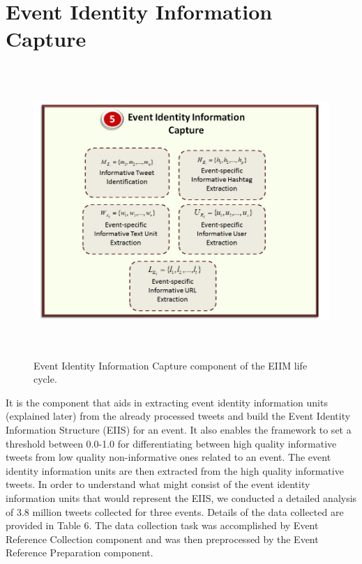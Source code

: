 \section{Event Identity Information Capture}

\begin{figure}[htbp]
  \caption{Event Identity Information Capture component of the EIIM life cycle.}
  \centering
    \includegraphics[width=14cm,height=11cm]{Figures/EIIMComponents/EventIdentityInformationCapture.jpg}
\end{figure}

It is the component that aids in extracting event identity information units (explained later) from the already processed tweets and build the Event Identity Information Structure (EIIS) for an event. It also enables the framework to set a threshold between 0.0-1.0 for differentiating between high quality informative tweets from low quality non-informative ones related to an event. The event identity information units are then extracted from the high quality informative tweets. 
In order to understand what might consist of the event identity information units that would represent the EIIS, we conducted a detailed analysis of 3.8 million tweets collected for three events. Details of the data collected are provided in Table 6. The data collection task was accomplished by Event Reference Collection component and was then preprocessed by the Event Reference Preparation component.

